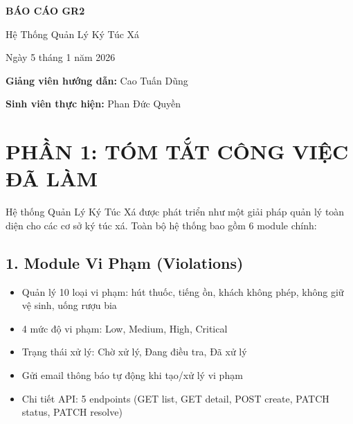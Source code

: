 \documentclass[10pt,a4paper]{article}
\begin{document}
\begin{titlepage}
    \centering
    \vspace*{2cm}
    
    {\fontsize{28}{34}\selectfont\bfseries BÁO CÁO GR2\par}
    \vspace{1cm}
    {\fontsize{20}{24}\selectfont Hệ Thống Quản Lý Ký Túc Xá\par}
    \vspace{0.8cm}
    {\fontsize{14}{18}\selectfont Ngày 5 tháng 1 năm 2026\par}
    
    \vfill
    
    {\normalsize 
    \t\textbf{Giảng viên hướng dẫn:} Cao Tuấn Dũng\par
    \vspace{0.3cm}
    \t\textbf{Sinh viên thực hiện:} Phan Đức Quyền\par
    }
    
    \vfill
    
\end{titlepage}

\newpage

\section*{PHẦN 1: TÓM TẮT CÔNG VIỆC ĐÃ LÀM}

Hệ thống Quản Lý Ký Túc Xá được phát triển như một giải pháp quản lý toàn diện cho các cơ sở ký túc xá. Toàn bộ hệ thống bao gồm 6 module chính:

\subsection*{1. Module Vi Phạm (Violations)}
\begin{itemize}[nosep]
    \item Quản lý 10 loại vi phạm: hút thuốc, tiếng ồn, khách không phép, không giữ vệ sinh, uống rượu bia
    \item 4 mức độ vi phạm: Low, Medium, High, Critical
    \item Trạng thái xử lý: Chờ xử lý, Đang điều tra, Đã xử lý
    \item Gửi email thông báo tự động khi tạo/xử lý vi phạm
    \item Chi tiết API: 5 endpoints (GET list, GET detail, POST create, PATCH status, PATCH resolve)
\end{itemize}
\end{document}
